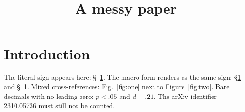 \documentclass{acmart}
\begin{document}
\title{A messy paper}
\section{Introduction}
\label{sec:intro}
The literal sign appears here: §~\ref{sec:intro}.
The macro form renders as the same sign: \S\ref{sec:intro} and \S~\ref{sec:intro}.
Mixed cross-references: Fig.~\ref{fig:one} next to Figure~\ref{fig:two}.
Bare decimals with no leading zero: $p < .05$ and $d = .21$.
The arXiv identifier 2310.05736 must still not be counted.
\end{document}
